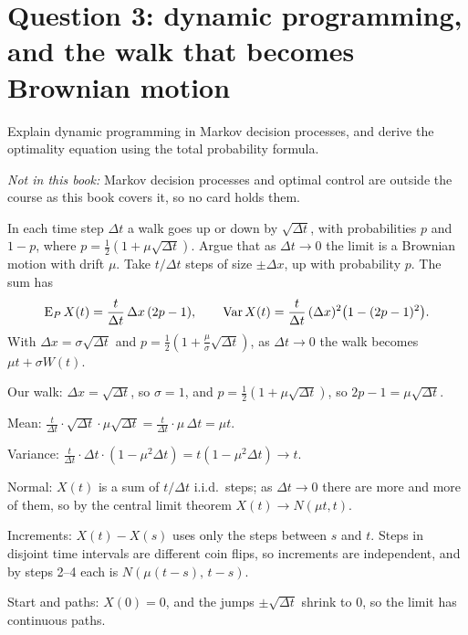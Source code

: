 \section{Question 3: dynamic programming, and the walk that becomes Brownian motion}

\begin{problem}[Q3(a)]
Explain dynamic programming in Markov decision processes, and derive the optimality equation using the total probability formula.

\textit{Not in this book:} Markov decision processes and optimal control are outside the course as this book covers it, so no card holds them.
\end{problem}

\begin{problem}[Q3(b)]
In each time step $\Delta t$ a walk goes up or down by $\sqrt{\Delta t}$, with probabilities $p$ and $1-p$, where $p=\frac12(1+\mu\sqrt{\Delta t})$. Argue that as $\Delta t\to0$ the limit is a Brownian motion with drift $\mu$.
\cardsays Take $t/\Delta t$ steps of size $\pm\Delta x$, up with probability $p$. The sum has
\[
\operatorname{E}_PX(t)=\frac{t}{\Delta t}\,\Delta x\,(2p-1),\qquad\operatorname{Var} X(t)=\frac{t}{\Delta t}\,(\Delta x)^2\big(1-(2p-1)^2\big).
\]
With $\Delta x=\sigma\sqrt{\Delta t}$ and $p=\frac12(1+\frac\mu\sigma\sqrt{\Delta t})$, as $\Delta t\to0$ the walk becomes $\mu t+\sigma W(t)$.
\working
\begin{steps}
\item Our walk: $\Delta x=\sqrt{\Delta t}$, so $\sigma=1$, and $p=\frac12(1+\mu\sqrt{\Delta t})$, so $2p-1=\mu\sqrt{\Delta t}$.
\item Mean: $\frac t{\Delta t}\cdot\sqrt{\Delta t}\cdot\mu\sqrt{\Delta t}=\frac t{\Delta t}\cdot\mu\,\Delta t=\mu t$.
\item Variance: $\frac t{\Delta t}\cdot\Delta t\cdot(1-\mu^2\Delta t)=t(1-\mu^2\Delta t)\to t$.
\item Normal: $X(t)$ is a sum of $t/\Delta t$ i.i.d.\ steps; as $\Delta t\to0$ there are more and more of them, so by the central limit theorem $X(t)\to N(\mu t,t)$.
\item Increments: $X(t)-X(s)$ uses only the steps between $s$ and $t$. Steps in disjoint time intervals are different coin flips, so increments are independent, and by steps 2--4 each is $N(\mu(t-s),\,t-s)$.
\item Start and paths: $X(0)=0$, and the jumps $\pm\sqrt{\Delta t}$ shrink to $0$, so the limit has continuous paths.
\end{steps}
\end{problem}


